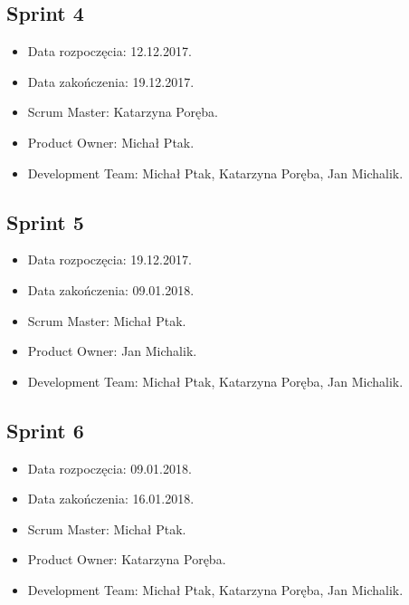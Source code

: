 \documentclass[a4paper]{article}
\begin{document}
\subsection{Sprint 4}

\begin{itemize}
\item Data rozpoczęcia: 12.12.2017.
\item Data zakończenia: 19.12.2017.
\item Scrum Master: Katarzyna Poręba.
\item Product Owner: Michał Ptak.
\item Development Team: Michał Ptak, Katarzyna Poręba, Jan Michalik.
\end{itemize}

\subsection{Sprint 5}

\begin{itemize}
\item Data rozpoczęcia: 19.12.2017.
\item Data zakończenia: 09.01.2018.
\item Scrum Master: Michał Ptak.
\item Product Owner: Jan Michalik.
\item Development Team: Michał Ptak, Katarzyna Poręba, Jan Michalik.
\end{itemize}

\subsection{Sprint 6}

\begin{itemize}
\item Data rozpoczęcia: 09.01.2018.
\item Data zakończenia: 16.01.2018.
\item Scrum Master: Michał Ptak.
\item Product Owner: Katarzyna Poręba.
\item Development Team: Michał Ptak, Katarzyna Poręba, Jan Michalik.
\end{itemize}

\end{document}
